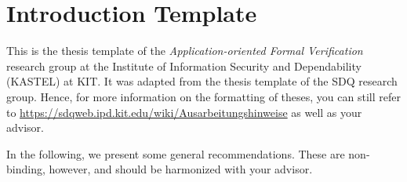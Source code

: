 
\chapter{Introduction Template}
\label{ch:IntroductionTemplate}


This is the thesis template of the \emph{Application-oriented Formal Verification}
research group at the Institute of Information Security and Dependability (KASTEL) at KIT. It was adapted
from the thesis template of the SDQ research group.
Hence, for more information on the formatting of theses, you can still refer to
\url{https://sdqweb.ipd.kit.edu/wiki/Ausarbeitungshinweise} as well as your advisor.


In the following, we present some general recommendations.
These are non-binding, however, and should be harmonized with your advisor.

% 

